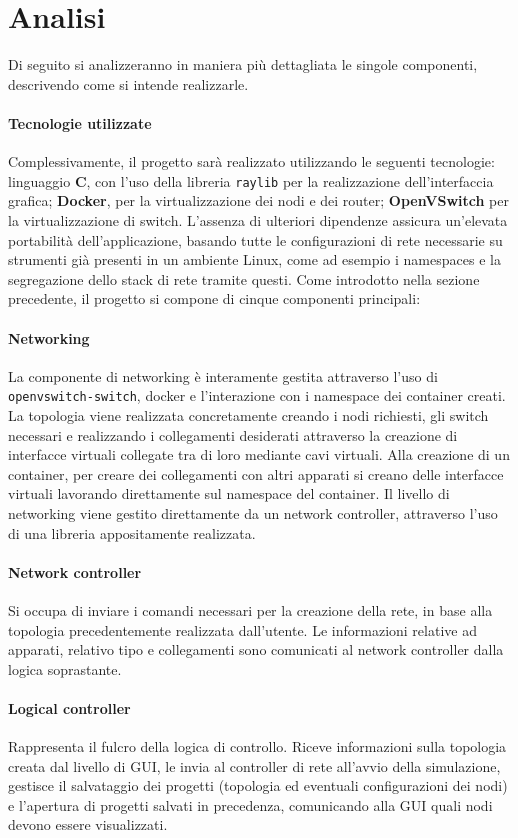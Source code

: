 \section{Analisi}
Di seguito si analizzeranno in maniera più dettagliata le singole componenti, descrivendo come si intende realizzarle. 
\paragraph*{Tecnologie utilizzate} Complessivamente, il progetto sarà realizzato utilizzando le seguenti tecnologie: linguaggio \textbf{C}, con l'uso della libreria \texttt{raylib} per la realizzazione dell'interfaccia grafica; \textbf{Docker}, per la virtualizzazione dei nodi e dei router; \textbf{OpenVSwitch} per la virtualizzazione di switch. L'assenza di ulteriori dipendenze assicura un'elevata portabilità dell'applicazione, basando tutte le configurazioni di rete necessarie su strumenti già presenti in un ambiente Linux, come ad esempio i namespaces e la segregazione dello stack di rete tramite questi. 
\newline\newline
Come introdotto nella sezione precedente, il progetto si compone di cinque componenti principali:
\paragraph*{Networking} La componente di networking è interamente gestita attraverso l'uso di \texttt{openvswitch-switch}, docker e l'interazione con i namespace dei container creati. La topologia viene realizzata concretamente creando i nodi richiesti, gli switch necessari e realizzando i collegamenti desiderati attraverso la creazione di interfacce virtuali collegate tra di loro mediante cavi virtuali. Alla creazione di un container, per creare dei collegamenti con altri apparati si creano delle interfacce virtuali lavorando direttamente sul namespace del container. Il livello di networking viene gestito direttamente da un network controller, attraverso l'uso di una libreria appositamente realizzata. 
\paragraph*{Network controller} Si occupa di inviare i comandi necessari per la creazione della rete, in base alla topologia precedentemente realizzata dall'utente. Le informazioni relative ad apparati, relativo tipo e collegamenti sono comunicati al network controller dalla logica soprastante. 
\paragraph*{Logical controller} Rappresenta il fulcro della logica di controllo. Riceve informazioni sulla topologia creata dal livello di GUI, le invia al controller di rete all'avvio della simulazione, gestisce il salvataggio dei progetti (topologia ed eventuali configurazioni dei nodi) e l'apertura di progetti salvati in precedenza, comunicando alla GUI quali nodi devono essere visualizzati. 
